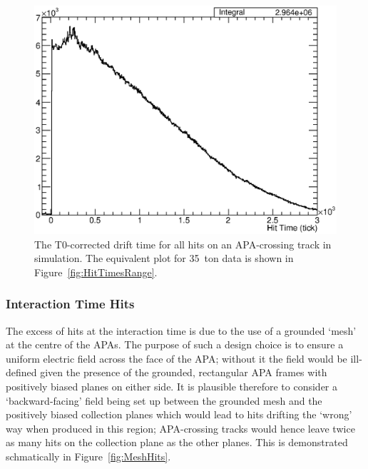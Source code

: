 \begin{figure}
  \centering
  \includegraphics[width=12cm]{HitTimesMC.eps}
  \caption[The T0-corrected drift time for all hits on an APA-crossing track in simulation.]{The T0-corrected drift time for all hits on an APA-crossing track in simulation.  The equivalent plot for 35~ton data is shown in Figure~\ref{fig:HitTimesRange}.}
  \label{fig:HitTimesMC}
\end{figure}

\subsubsection{Interaction Time Hits}\label{sec:InteractionTimeHits}

The excess of hits at the interaction time is due to the use of a grounded `mesh' at the centre of the APAs.  The purpose of such a design choice is to ensure a uniform electric field across the face of the APA; without it the field would be ill-defined given the presence of the grounded, rectangular APA frames with positively biased planes on either side.  It is plausible therefore to consider a `backward-facing' field being set up between the grounded mesh and the positively biased collection planes which would lead to hits drifting the `wrong' way when produced in this region; APA-crossing tracks would hence leave twice as many hits on the collection plane as the other planes.  This is demonstrated schmatically in Figure~\ref{fig:MeshHits}.

